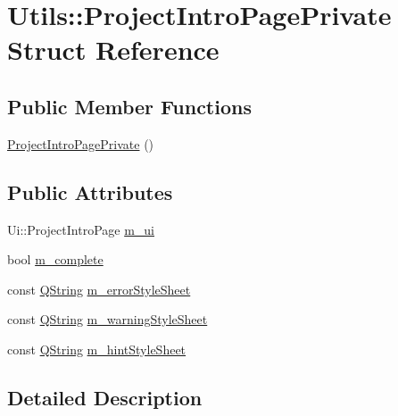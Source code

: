 \hypertarget{struct_utils_1_1_project_intro_page_private}{\section{Utils\-:\-:Project\-Intro\-Page\-Private Struct Reference}
\label{struct_utils_1_1_project_intro_page_private}
}
\subsection*{Public Member Functions}
\begin{DoxyCompactItemize}
\item 
\hyperlink{struct_utils_1_1_project_intro_page_private_a192eb9c2bdd9255d53e80d778f5fe78f}{Project\-Intro\-Page\-Private} ()
\end{DoxyCompactItemize}
\subsection*{Public Attributes}
\begin{DoxyCompactItemize}
\item 
Ui\-::\-Project\-Intro\-Page \hyperlink{struct_utils_1_1_project_intro_page_private_a8b58b2c9069e4ea0e1dbf49d0588f17e}{m\-\_\-ui}
\item 
bool \hyperlink{struct_utils_1_1_project_intro_page_private_a8d0cb35df948b6dc11517180d9c48efa}{m\-\_\-complete}
\item 
const \hyperlink{group___u_a_v_objects_plugin_gab9d252f49c333c94a72f97ce3105a32d}{Q\-String} \hyperlink{struct_utils_1_1_project_intro_page_private_ae97c602c737715475e942302671f5aaf}{m\-\_\-error\-Style\-Sheet}
\item 
const \hyperlink{group___u_a_v_objects_plugin_gab9d252f49c333c94a72f97ce3105a32d}{Q\-String} \hyperlink{struct_utils_1_1_project_intro_page_private_a6b536310e9c0d07f8eb1ac3f84f8d9b0}{m\-\_\-warning\-Style\-Sheet}
\item 
const \hyperlink{group___u_a_v_objects_plugin_gab9d252f49c333c94a72f97ce3105a32d}{Q\-String} \hyperlink{struct_utils_1_1_project_intro_page_private_a0bff93c252b31403685c055919bd6256}{m\-\_\-hint\-Style\-Sheet}
\end{DoxyCompactItemize}


\subsection{Detailed Description}


